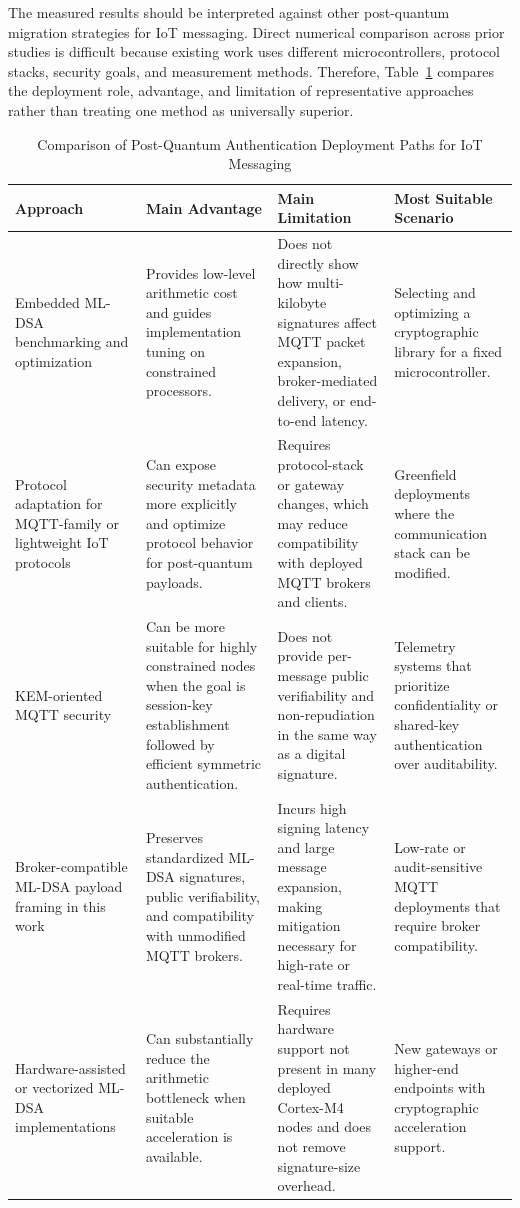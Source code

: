 \documentclass[final, twoside]{IEEEtran} %
\begin{document}
The measured results should be interpreted against other post-quantum migration strategies for IoT messaging. Direct numerical comparison across prior studies is difficult because existing work uses different microcontrollers, protocol stacks, security goals, and measurement methods. Therefore, Table~\ref{tab:deployment-comparison} compares the deployment role, advantage, and limitation of representative approaches rather than treating one method as universally superior.

\begin{table}[t]
	\centering
	\caption{Comparison of Post-Quantum Authentication Deployment Paths for IoT Messaging}
	\label{tab:deployment-comparison}
	\small
	\begin{tabularx}{\textwidth}{p{}p{}p{}p{}}
		\toprule
		\textbf{Approach} & \textbf{Main Advantage} & \textbf{Main Limitation} & \textbf{Most Suitable Scenario} \\
		\midrule
		Embedded ML-DSA benchmarking and optimization~\cite{Benchmark2022,pqm4-benchmarks,Barrett2023} & Provides low-level arithmetic cost and guides implementation tuning on constrained processors. & Does not directly show how multi-kilobyte signatures affect MQTT packet expansion, broker-mediated delivery, or end-to-end latency. & Selecting and optimizing a cryptographic library for a fixed microcontroller. \\
		\midrule
		Protocol adaptation for MQTT-family or lightweight IoT protocols~\cite{BlancoRomero2024} & Can expose security metadata more explicitly and optimize protocol behavior for post-quantum payloads. & Requires protocol-stack or gateway changes, which may reduce compatibility with deployed MQTT brokers and clients. & Greenfield deployments where the communication stack can be modified. \\
		\midrule
		KEM-oriented MQTT security~\cite{Kim2025} & Can be more suitable for highly constrained nodes when the goal is session-key establishment followed by efficient symmetric authentication. & Does not provide per-message public verifiability and non-repudiation in the same way as a digital signature. & Telemetry systems that prioritize confidentiality or shared-key authentication over auditability. \\
		\midrule
		Broker-compatible ML-DSA payload framing in this work & Preserves standardized ML-DSA signatures, public verifiability, and compatibility with unmodified MQTT brokers. & Incurs high signing latency and large message expansion, making mitigation necessary for high-rate or real-time traffic. & Low-rate or audit-sensitive MQTT deployments that require broker compatibility. \\
		\midrule
		Hardware-assisted or vectorized ML-DSA implementations~\cite{Wei2025,Norga2025} & Can substantially reduce the arithmetic bottleneck when suitable acceleration is available. & Requires hardware support not present in many deployed Cortex-M4 nodes and does not remove signature-size overhead. & New gateways or higher-end endpoints with cryptographic acceleration support. \\
		\bottomrule
	\end{tabularx}
\end{table}
\end{document}
